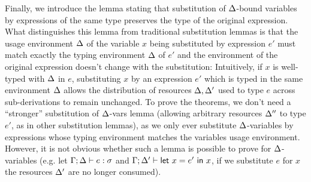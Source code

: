 
Finally, we introduce the lemma stating that substitution of $\Delta$-bound
variables by expressions of the same type preserves the type of the original
expression.
%
What distinguishes this lemma from traditional substitution lemmas is that the
usage environment $\Delta$ of the variable $x$ being substituted by expression $e'$
must match exactly the typing environment $\Delta$ of $e'$ and the
environment of the original expression doesn't change with the substitution:
%
\DeltaSubstitutionLemma
%
\noindent Intuitively, if $x$ is well-typed with $\Delta$ in $e$, substituting $x$
by an expression $e'$ which is typed in the same environment $\Delta$ allows the
distribution of resources $\Delta,\Delta'$ used to type $e$ across sub-derivations to remain
unchanged. To prove the theorems, we don't need a ``stronger'' substitution of
$\Delta$-vars lemma (allowing arbitrary resources $\Delta''$ to type $e'$, as in other
substitution lemmas), as we only ever substitute $\Delta$-variables by expressions
whose typing environment matches the variables usage environment. However, it
is not obvious whether such a lemma is possible to prove for $\Delta$-variables
(e.g. let $\Gamma;\Delta \vdash e :\sigma$ and $\Gamma; \Delta' \vdash \mathsf{let}~x = e'~\mathsf{in}~x$, if we
substitute $e$ for $x$ the resources $\Delta'$ are no longer consumed).

